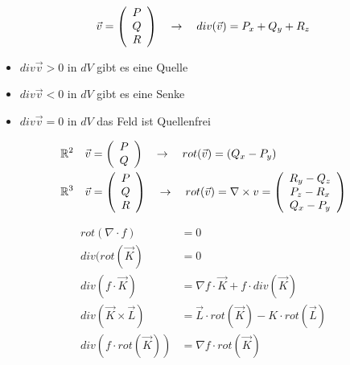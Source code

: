 \documentclass[a4paper]{article}
\begin{document}
	\begin{multicols}{2}
		\begin{fdef}[Divergenz]
			\begin{align*}
				\vec v = \left( \begin{array}{c} P \\ Q \\ R \end{array} \right) \quad \rightarrow \quad div(\vec v) = P_x + Q_y + R_z
			\end{align*}
			\begin{itemize}
			 \item $div \vec v > 0$ in $dV$ gibt es eine Quelle
			 \item $div \vec v < 0$ in $dV$ gibt es eine Senke
			 \item $div \vec v = 0$ in $dV$ das Feld ist Quellenfrei
			\end{itemize}
		\end{fdef}
		
		\begin{fdef}[Rotation]
				\begin{align*}
					\mathbb{R}^2 \quad &\vec v = \left( \begin{array}{c} P \\ Q \end{array} \right) \quad \rightarrow \quad rot (\vec v ) = (Q_x - P_y)\\
			 		\mathbb{R}^3 \quad &\vec v = \left( \begin{array}{c} P \\ Q \\ R \end{array} \right) \quad \rightarrow \quad rot (\vec v) = \nabla \times v =
			 			\left( \begin{array}{c} R_y - Q_z \\ P_z - R_x \\ Q_x - P_y \end{array} \right)
			 	\end{align*}
		\end{fdef}
	\end{multicols}
		\begin{fmerke}
			\begin{align*}
				rot(\nabla \cdot f )&= 0\\
				div(rot(\vec K) &= 0\\
				div(f \cdot \vec K) &= \nabla f \cdot \vec K + f \cdot div(\vec K)\\
				div(\vec K \times \vec L) &= \vec L \cdot rot(\vec K) - K \cdot rot(\vec L)\\
				div(f \cdot rot(\vec K)) &= \nabla f \cdot rot(\vec K)
			\end{align*}
		\end{fmerke}
\end{document}

